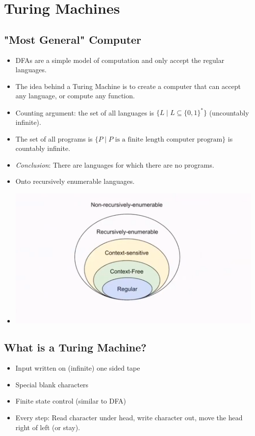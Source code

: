 \section{Turing Machines}

\subsection{"Most General" Computer}
\begin{itemize}
    \item DFAs are a simple model of computation and only accept the regular languages.
    \item The idea behind a Turing Machine is to create a computer that can accept any language, or compute any function.
    \item Counting argument: the set of all languages is $\{ L \mid L \subseteq \{ 0, 1 \}^{\ast} \}$ (uncountably infinite).
    \item The set of all programs is $\{ P \mid P \text{ is a finite length computer program} \}$ is countably infinite.
    \item \textit{Conclusion}: There are languages for which there are no programs.
    \item Onto recursively enumerable languages.
    \item[] \includegraphics[width=\textwidth]{lecture8/images/chomsky-hierarchy-context-sensitive.png}
\end{itemize}

\subsection{What is a Turing Machine?}
\begin{itemize}
    \item Input written on (infinite) one sided tape
    \item Special blank characters
    \item Finite state control (similar to DFA)
    \item Every step: Read character under head, write character out, move the head right of left (or stay).
\end{itemize}

